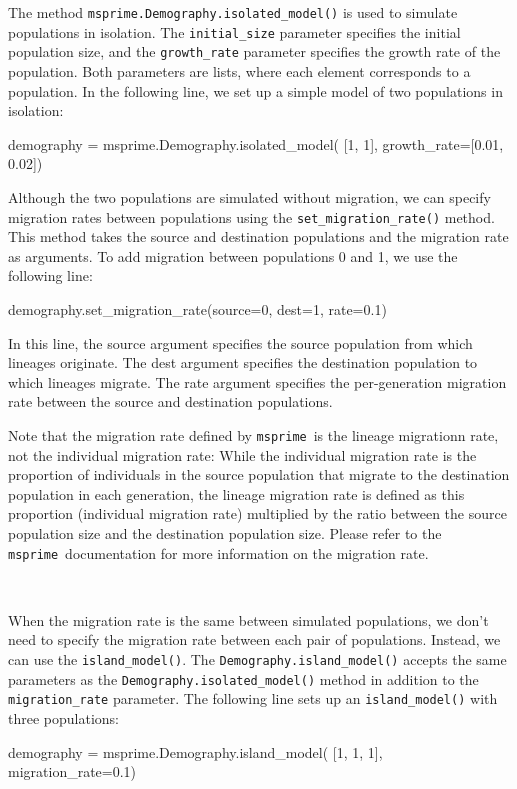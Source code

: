 \documentclass[graybox]{svmult}
\newcommand{\msprime}[0]{\texttt{msprime}}
\begin{document}
The method \texttt{msprime.Demography.isolated\_model()} is used to
simulate populations in isolation. The \texttt{initial\_size} parameter
specifies the initial population size, and the \texttt{growth\_rate}
parameter specifies the growth rate of the population. Both parameters
are lists, where each element corresponds to a population. In the
following line, we set up a simple model of two populations in isolation:
\begin{pythoncode}
    demography = msprime.Demography.isolated_model(
        [1, 1], growth_rate=[0.01, 0.02])
\end{pythoncode}
Although the two populations are simulated without migration, we can
specify migration rates between populations using the \texttt{set\_migration\_rate()}
method. This method takes the source and destination populations and the migration rate as arguments.
To add migration between populations 0 and 1, we use the following line:
\begin{pythoncode}
    demography.set_migration_rate(source=0, dest=1, rate=0.1)
\end{pythoncode}

In this line, the source argument specifies the source population from which lineages originate. The
dest argument specifies the destination population to which lineages migrate. The rate argument
specifies the per-generation migration rate between the source and destination populations.

Note that the migration rate defined by \msprime\ is the lineage migrationn rate, not the individual
migration rate: While the individual migration rate is the proportion of individuals in the source
population that migrate to the destination population in each generation, the lineage migration rate
is defined as this proportion (individual migration rate) multiplied by the ratio between the source
population size and the destination population size. Please refer to the \msprime\ documentation for
more information on the migration rate.

\label{island-model} \

When the migration rate is the same between simulated populations, we don't
need to specify the migration rate between each pair of populations. Instead,
we can use the \texttt{island\_model()}. The \texttt{Demography.island\_model()} accepts
the same parameters as the \texttt{Demography.isolated\_model()} method in
addition to the \texttt{migration\_rate} parameter. The following line sets up an
\texttt{island\_model()} with three populations:
\begin{pythoncode}
    demography = msprime.Demography.island_model(
        [1, 1, 1], migration_rate=0.1)
\end{pythoncode}
\end{document}
